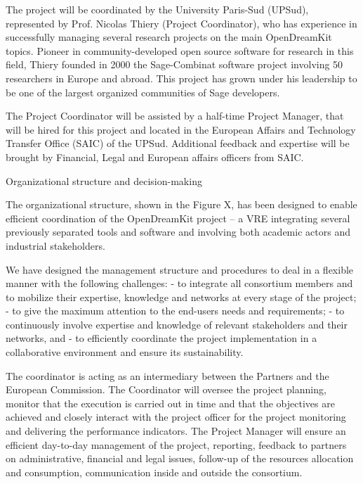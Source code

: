 \label{sect:mgt}

The project will be coordinated by the University Paris-Sud (UPSud), represented by Prof. Nicolas Thiery (Project Coordinator),
who has experience in successfully managing several research projects on the main OpenDreamKit topics.
Pioneer in community-developed open source software for research in this field, 
Thiery founded in 2000 the Sage-Combinat software project involving  50 researchers in Europe and abroad. 
This project has grown under his leadership to be one of the largest organized communities of Sage developers. 

The Project Coordinator will be assisted by a half-time Project Manager, that will be hired for this project
and located in the European Affairs and Technology Transfer Office (SAIC) of the UPSud. 
Additional feedback and expertise will be brought by Financial, Legal and European affairs officers from SAIC. 

Organizational structure and decision-making

The organizational structure, shown in the Figure X, has been designed to enable efficient coordination
of the OpenDreamKit project – a VRE integrating several previously separated tools and software 
and involving both academic actors and industrial stakeholders.

We have designed the management structure and procedures to deal in a flexible manner with
the following challenges:
- to integrate all consortium members and to mobilize their expertise, knowledge and networks at every stage of the project;
- to give the maximum attention to the end-users needs and requirements;
- to continuously involve expertise and knowledge of relevant stakeholders and their networks, and
- to efficiently coordinate the project implementation in a collaborative environment and ensure its sustainability.

The coordinator  is acting as an intermediary between the Partners and the European Commission. 
The Coordinator will oversee the project planning, monitor that the execution is carried out in time and that the objectives
are achieved and closely interact with the project officer for the project monitoring and delivering the performance indicators.  
The Project Manager will ensure an efficient day-to-day management of the project, reporting, feedback to partners
on administrative, financial and legal issues, follow-up of the resources allocation and consumption, 
communication inside and outside the consortium.

